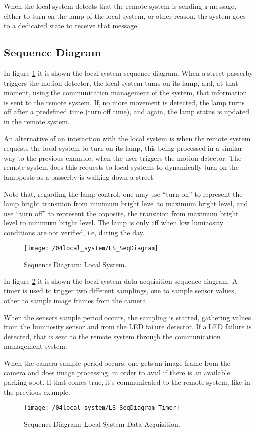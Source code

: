 When the local system detects that the remote system is sending a message, either to turn on the lamp of the local system, or other reason, the system goes to a dedicated state to receive that message.

\subsection{Sequence Diagram}
In figure \ref{fig:ls_seq_diagram} it is shown the local system sequence diagram. When a street passerby triggers the motion detector, the local system turns on its lamp, and, at that moment, using the communication management of the system, that information is sent to the remote system. If, no more movement is detected, the lamp turns off after a predefined time (turn off time), and again, the lamp status is updated in the remote system.

An alternative of an interaction with the local system is when the remote system requests the local system to turn on its lamp, this being processed in a similar way to the previous example, when the user triggers the motion detector. The remote system does this requests to local systems to dynamically turn on the lampposts as a passerby is walking down a street.

Note that, regarding the lamp control, one may use “turn on” to represent the lamp bright transition from minimum bright level to maximum bright level, and use “turn off” to represent the opposite, the transition from maximum bright level to minimum bright level. The lamp is only off when low luminosity conditions are not verified, i.e, during the day.

\begin{figure}[H]
	\centering
	\texttt{[image: /04local\_system/LS\_SeqDiagram]}
	\caption{Sequence Diagram: Local System.}
	\label{fig:ls_seq_diagram}
\end{figure}

\clearpage
In figure \ref{fig:ls_seq_diagram_timer} it is shown the local system data acquisition sequence diagram. A timer is used to trigger two different samplings, one to sample sensor values, other to sample image frames from the camera. 

When the sensors sample period occurs, the sampling is started, gathering values from the luminosity sensor and from the LED failure detector. If a LED failure is detected, that is sent to the remote system through the communication management system.

When the camera sample period occurs, one gets an image frame from the camera and does image processing, in order to avail if there is an available parking spot. If that comes true, it's communicated to the remote system, like in the previous example.

\begin{figure}[H]
	\centering
	\texttt{[image: /04local\_system/LS\_SeqDiagram\_Timer]}
	\caption{Sequence Diagram: Local System Data Acquisition.}
	\label{fig:ls_seq_diagram_timer}
\end{figure}